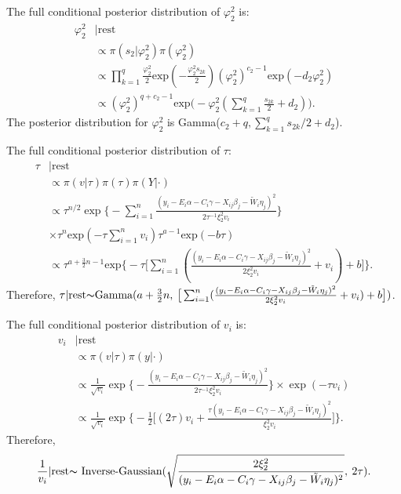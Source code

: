 \documentclass[12pt]{article}
\begin{document}
The full conditional posterior distribution of $\varphi_2^2$ is:
\begin{equation*}
\begin{aligned}
\varphi_2^2&|\text{rest} \\
&\propto \pi(s_2|\varphi_2^2)\pi(\varphi_2^2)\\
&\propto \prod_{k=1}^{q}\frac{\varphi_2^2}{2} \text{exp}(-\frac{\varphi_2^2 s_{2k}}{2})(\varphi_2^2)^{c_2-1}\text{exp}(-d_2\varphi_2^2)\\
&\propto (\varphi_2^2)^{q+c_2-1} \text{exp}\Big(- \varphi_2^2(\sum_{k=1}^{q}\frac{s_{2k}}{2}+d_2)\Big).
\end{aligned}
\end{equation*}
The posterior distribution for $\varphi_2^2$ is Gamma($c_2+q, \sum_{k=1}^{q} s_{2k}/2+d_2$).\par

The full conditional posterior distribution of $\tau$:
\begin{equation*}
\begin{aligned}
\tau&|\text{rest} \\
& \propto \pi(v|\tau)\pi(\tau)\pi(Y|\cdot) \\
& \propto {\tau}^{n/2}\exp\Big\{- \sum_{i=1}^{n}\frac{(y_i - E_i \alpha - C_i \gamma - X_{ij}\beta_{j} - \tilde{W}_{i}\eta_{j})^2}{2 \tau^{-1} \xi_{2}^{2} v_i} \Big\}\\
& \times {\tau}^n \text{exp}(-\tau\sum_{i=1}^{n} v_i) \tau^{a-1} \text{exp}(-b\tau)\\
&\propto \tau^{a+\frac{3}{2}n-1} \text{exp}\Big\{-\tau\big[\sum_{i=1}^{n}(\frac{(y_i - E_i \alpha - C_i \gamma - X_{ij}\beta_{j} - \tilde{W}_{i}\eta_{j})^2}{2  \xi_{2}^{2} v_i} +v_i)+b\big] \Big\}.
\end{aligned}
\end{equation*}
Therefore, $\tau|\text{rest} {\thicksim} \text{Gamma}(a+\frac{3}{2}n, \:\big[\sum_{i=1}^{n}(\frac{(y_i - E_i \alpha - C_i \gamma - X_{ij}\beta_{j} - \tilde{W}_{i}\eta_{j})^2}{2  \xi_{2}^{2} v_i} +v_i)+b\big])$.\par
The full conditional posterior distribution of $v_i$ is:
\begin{equation*}
\begin{aligned}
v_i&|\text{rest} \\
& \propto \pi(v|\tau)\pi(y|\cdot) \\
& \propto \frac{1}{\sqrt{v_i}} \exp\Big\{- \frac{(y_i - E_i \alpha - C_i \gamma - X_{ij}\beta_{j} - \tilde{W}_{i}\eta_{j})^2}{2 \tau^{-1} \xi_{2}^{2} v_i} \Big\}
\times\exp(-\tau v_i)\\
& \propto \frac{1}{\sqrt{v_i}} \exp\Big\{-\frac{1}{2} \big[ (2\tau)v_i + \frac{\tau(y_i - E_i \alpha - C_i \gamma - X_{ij}\beta_{j} - \tilde{W}_{i}\eta_{j})^2}{\xi_{2}^{2} v_i}\big] \Big\}.
\end{aligned}
\end{equation*}
Therefore,
\begin{equation*}
\frac{1}{v_i}|\text{rest} {\thicksim}\text{ Inverse-Gaussian} (\sqrt{\frac{2 \xi_2^2}{(y_i - E_i \alpha - C_i \gamma - X_{ij}\beta_{j} - \tilde{W}_{i}\eta_{j})^2}}, \:2\tau).
\end{equation*}
\end{document}
